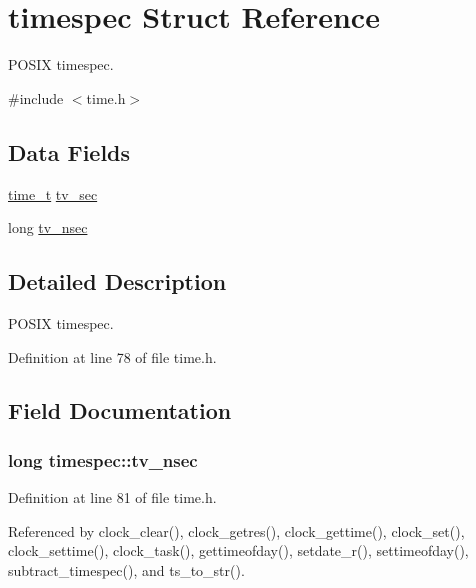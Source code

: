 \hypertarget{structtimespec}{}\section{timespec Struct Reference}
\label{structtimespec}


P\+O\+S\+IX timespec.  




{\ttfamily \#include $<$time.\+h$>$}

\subsection*{Data Fields}
\begin{DoxyCompactItemize}
\item 
\hyperlink{time_8h_a3346b04b0420b32ccf6b706551b70762}{time\+\_\+t} \hyperlink{structtimespec_afc3302668d7cb5952f590da69fdd4955}{tv\+\_\+sec}
\item 
long \hyperlink{structtimespec_ae3c7510dafa8cbcaede866ed13c99683}{tv\+\_\+nsec}
\end{DoxyCompactItemize}


\subsection{Detailed Description}
P\+O\+S\+IX timespec. 

Definition at line 78 of file time.\+h.



\subsection{Field Documentation}
\subsubsection[{\texorpdfstring{tv\+\_\+nsec}{tv_nsec}}]{\setlength{\rightskip}{0pt plus 5cm}long timespec\+::tv\+\_\+nsec}\hypertarget{structtimespec_ae3c7510dafa8cbcaede866ed13c99683}{}\label{structtimespec_ae3c7510dafa8cbcaede866ed13c99683}


Definition at line 81 of file time.\+h.



Referenced by clock\+\_\+clear(), clock\+\_\+getres(), clock\+\_\+gettime(), clock\+\_\+set(), clock\+\_\+settime(), clock\+\_\+task(), gettimeofday(), setdate\+\_\+r(), settimeofday(), subtract\+\_\+timespec(), and ts\+\_\+to\+\_\+str().

